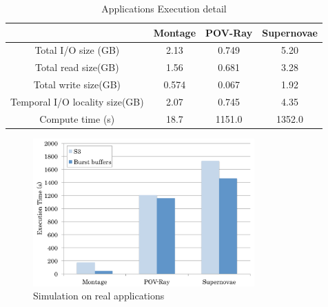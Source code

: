 \begin{table}
\centering
\begin{tabular}{|c|c|c|c|}
\hline
\rowcolor{darkgray} 						&	Montage		&		POV-Ray		&		Supernovae		\\\hline
\cellcolor{lightgray} Total I/O size (GB)	&	2.13	&		0.749	&		5.20		\\\hline
 \cellcolor{lightgray}Total read size(GB)	&	1.56	&		0.681	&		3.28		\\\hline
 \cellcolor{lightgray}Total write size(GB)	&	0.574	&		0.067	&		1.92		\\\hline
 \cellcolor{lightgray}Temporal I/O locality size(GB)	&	2.07	&		0.745	&		4.35	
 \\\hline \cellcolor{lightgray}Compute time (s)		&	18.7	&		1151.0	&	
 1352.0		\\
\hline
\end{tabular}
\caption{Applications Execution detail}
\label{evaluation:application execution detail}
\end{table}


\begin{figure}
\centering
\includegraphics[width=8.5cm]{img/workflows}
\caption{Simulation on real applications}
\label{evaluation:simulation result montage}
\end{figure}

